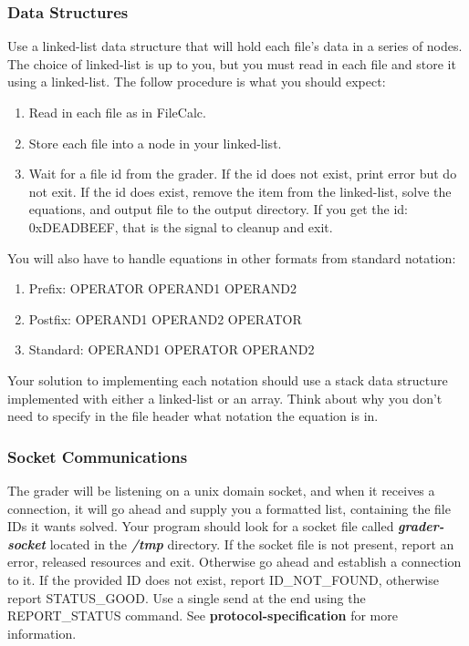 \documentclass[letterpaper,12pt]{article}
\begin{document}
	\subsubsection{Data Structures}
	Use a linked-list data structure that will hold each file's data in a series of nodes. The choice of linked-list is up to you, but you must read in each file and store it using a linked-list. The follow procedure is what you should expect:
	\begin{enumerate}
		\item Read in each file as in FileCalc.
		\item Store each file into a node in your linked-list.
		\item Wait for a file id from the grader. If the id does not exist, print error but do not exit. If the id does exist, remove the item from the linked-list, solve the equations, and output file to the output directory. If you get the id: 0xDEADBEEF, that is the signal to cleanup and exit.
	\end{enumerate}
	You will also have to handle equations in other formats from standard notation:
	\begin{enumerate}
		\item Prefix: OPERATOR OPERAND1 OPERAND2
		\item Postfix: OPERAND1 OPERAND2 OPERATOR
		\item Standard: OPERAND1 OPERATOR OPERAND2
	\end{enumerate}
	
	Your solution to implementing each notation should use a stack data structure implemented with either a linked-list or an array. Think about why you don't need to specify in the file header what notation the equation is in.
	
	\subsubsection{Socket Communications}
	The grader will be listening on a unix domain socket, and when it receives a connection, it will go ahead and supply you a formatted list, containing the file IDs it wants solved. Your program should look for a socket file called \textbf{\emph{grader-socket}} located in the \textbf{\emph{/tmp}} directory. If the socket file is not present, report an error, released resources and exit. Otherwise go ahead and establish a connection to it. If the provided ID does not exist, report ID\_NOT\_FOUND, otherwise report STATUS\_GOOD. Use a single send at the end using the REPORT\_STATUS command. See \textbf{protocol-specification} for more information.
	
\end{document}
